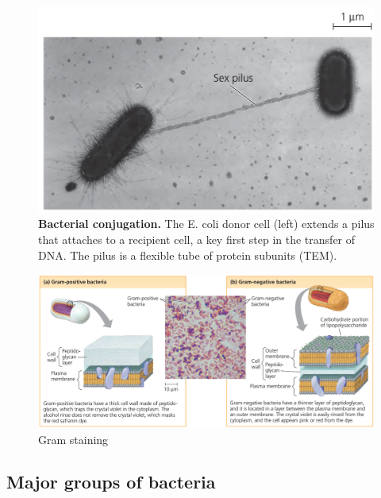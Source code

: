 \documentclass[ignorenonframetext,aspectratio=169]{beamer}
\begin{document}
\begin{frame}{}
\protect\hypertarget{section-5}{}

\begin{figure}
\includegraphics[width=0.55\linewidth]{./../images/bacterial_conjugation_pilus} \caption{\textbf{Bacterial conjugation.} \newline The E. coli donor cell (left) extends a pilus that attaches to a recipient cell, a key first step in the transfer of DNA. The pilus is a flexible tube of protein subunits (TEM).}\label{fig:bacterial-conjugation}
\end{figure}

\end{frame}

\begin{frame}{}
\protect\hypertarget{section-6}{}

\begin{figure}
\includegraphics[width=0.7\linewidth]{./../images/gram_staining} \caption{Gram staining}\label{fig:gram-staining}
\end{figure}

\end{frame}

\hypertarget{major-groups-of-bacteria}{%
\subsection{Major groups of bacteria}\label{major-groups-of-bacteria}}
\end{document}
